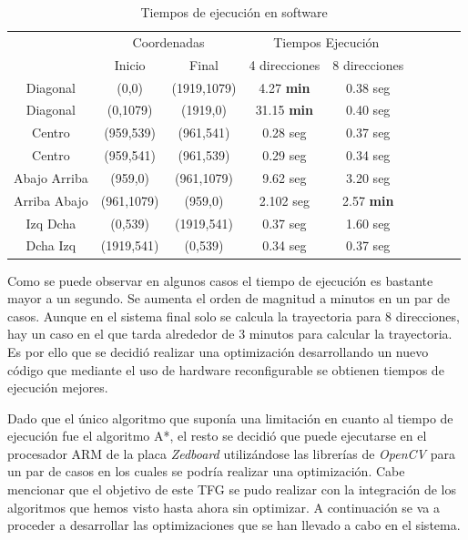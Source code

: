 \begin{table}[hbtp]
  \centering
  \begin{tabular}{|c|c|c|c|c|c|c|c|c|}
    \hline
   \multicolumn{1}{|c|}{} & \multicolumn{2}{c|}{Coordenadas} & \multicolumn{2}{c|}{Tiempos Ejecución} \\ \cline{2-5}
    \multicolumn{1}{|c|}{}&Inicio&Final&4 direcciones& 8 direcciones\\
    \hline
    Diagonal&(0,0)&(1919,1079)&4.27 \textbf{min} &0.38 seg \\
    \hline
    Diagonal&(0,1079)&(1919,0)&31.15 \textbf{min}&0.40 seg\\
    \hline
    Centro&(959,539)&(961,541)&0.28 seg&0.37 seg\\
    \hline
    Centro&(959,541)&(961,539)&0.29 seg&0.34 seg\\
    \hline
    Abajo Arriba&(959,0)&(961,1079)&9.62 seg&3.20 seg\\
    \hline
    Arriba Abajo&(961,1079)&(959,0)&2.102 seg&2.57 \textbf{min}\\
    \hline
    Izq Dcha&(0,539)&(1919,541)&0.37 seg&1.60 seg\\
    \hline
    Dcha Izq&(1919,541)&(0,539)&0.34 seg&0.37 seg\\
    \hline
  \end{tabular}
  \caption{Tiempos de ejecución en software}
  \label{tab:TiemposEjecucionSoftware}
\end{table}

Como se puede observar en algunos casos el tiempo de ejecución es bastante mayor a un segundo. Se aumenta el orden de magnitud a minutos en un par de casos. Aunque en el sistema final solo se calcula la trayectoria para 8 direcciones, hay un caso en el que tarda alrededor de 3 minutos para calcular la trayectoria. Es por ello que se decidió realizar una optimización desarrollando un nuevo código que mediante el uso de hardware reconfigurable se obtienen tiempos de ejecución mejores.

Dado que el único algoritmo que suponía una limitación en cuanto al tiempo de ejecución fue el algoritmo A*, el resto se decidió que puede ejecutarse en el procesador \ac{ARM} de la placa \emph{Zedboard} utilizándose las librerías de \emph{OpenCV} para un par de casos en los cuales se podría realizar una optimización. Cabe mencionar que el objetivo de este \ac{TFG} se pudo realizar con la integración de los algoritmos que hemos visto hasta ahora sin optimizar. A continuación se va a proceder a desarrollar las optimizaciones que se han llevado a cabo en el sistema. 

